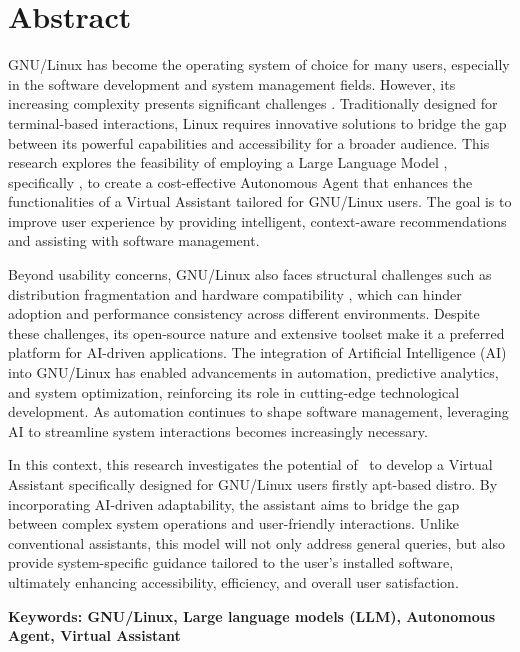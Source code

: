 \chapter*{Abstract}

GNU/Linux has become the operating system of choice for many users, especially in the software development and system management fields. However, its increasing complexity presents significant challenges \cite{gonzalez2005analyzing}. Traditionally designed for terminal-based interactions, Linux requires innovative solutions to bridge the gap between its powerful capabilities and accessibility for a broader audience. This research explores the feasibility of employing a Large Language Model \cite{sheng2023s-loraLLM, devlin2019bertLLM}, specifically \GenModel, to create a cost-effective Autonomous Agent that enhances the functionalities of a Virtual Assistant \cite{liu2023whenLLM, marukatat2021textLLM, hu2021loraLLM, sheng2023s-loraLLM, devlin2019bertLLM} tailored for GNU/Linux users. The goal is to improve user experience by providing intelligent, context-aware recommendations and assisting with software management.

Beyond usability concerns, GNU/Linux also faces structural challenges such as distribution fragmentation and hardware compatibility \cite{zambrano2022implementacion}, which can hinder adoption and performance consistency across different environments. Despite these challenges, its open-source nature and extensive toolset make it a preferred platform for AI-driven applications. The integration of Artificial Intelligence (AI) into GNU/Linux has enabled advancements in automation, predictive analytics, and system optimization, reinforcing its role in cutting-edge technological development. As automation continues to shape software management, leveraging AI to streamline system interactions becomes increasingly necessary.

In this context, this research investigates the potential of \GenModel\ to develop a Virtual Assistant specifically designed for GNU/Linux users firstly apt-based distro. By incorporating AI-driven adaptability, the assistant aims to bridge the gap between complex system operations and user-friendly interactions. Unlike conventional assistants, this model will not only address general queries, but also provide system-specific guidance tailored to the user's installed software, ultimately enhancing accessibility, efficiency, and overall user satisfaction.


\textbf{Keywords: GNU/Linux, Large language models (LLM), Autonomous Agent, Virtual Assistant}